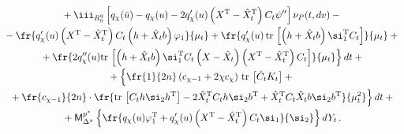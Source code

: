 \noindent

\begin{multline}

{}+\iii_{R_0^q} \left[ q_\chi(\bar u) -q_\chi (u) - 2 q_\chi'(u) 

\left(X^{\mathrm{T}}-\hat X_t^{\mathrm{T}}\right) C_t\psi''\right] \nu_P (t, dv) -{}\\[-1pt]

{}- \fr{q_\chi' (u) \left(X^{\mathrm{T}}-\hat X_t^{\mathrm{T}}\right) C_t

\left(h+\hat X_t b\right) \varphi_1}{\mu_t}  %

+\fr{q_\chi'(u) \,\mathrm{tr}\, \left[ \left(h+\hat X_t b\right) 

\si_1^{\mathrm{T}} 

C_t\right]}{\mu_t} + {}\\

\left.{}+\fr{2q_\chi''(u)\mathrm{tr}\, 

\left[ \left(h+ \hat X_t b\right) 

\si_1^{\mathrm{T}} C_t\left(X-\hat X_t\right) \left(X^{\mathrm{T}}-\hat 

X_t^{\mathrm{T}}\right) C_t

\right] }{\mu_t} \right\}dt +{}\\[-2pt]

{} + \left\{ 

\vphantom{\fr{\mathrm{tr}\, \left[ C_t h\si_2 

h^{\mathrm{T}}\right] - 2

    \hat X_t^{\mathrm{T}} C_t h \si_2 b^{\mathrm{T}} + \hat X_t^{\mathrm{T}} 

    C_t\hat X_t b \si_2  b^{\mathrm{T}}}{\mu_t^2}}

\fr{1}{2n} \left(c_{\chi-1} + 2\chi

    c_\chi\right)\,\mathrm{tr}\, \left[ \dot C_t K_t\right]+{}\right.\\[-1pt]

\left.{}+ \fr{c_{\chi-1}}{2n}\cdot

\fr{\mathrm{tr}\, \left[ C_t h\si_2 

h^{\mathrm{T}}\right] - 2

    \hat X_t^{\mathrm{T}} C_t h \si_2 b^{\mathrm{T}} + \hat X_t^{\mathrm{T}} 

    C_t\hat X_t b \si_2  b^{\mathrm{T}}}{\mu_t^2}\right\} dt+{}\\[-1pt]

{}+ {\sf M}_{\Delta^x}^{p^*}\left\{ 

\fr{q_\chi (u)

    \varphi_1^{\mathrm{T}} + q_\chi'(u) \left(X^{\mathrm{T}}-\hat X_t^{\mathrm{T}}\right) 

    C_t\si_1}{\si_2}

    \right\} dY_t\,.

\label{e3.34-s2}

    \end{multline}



